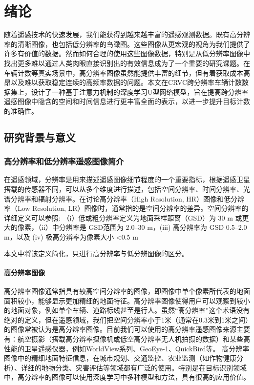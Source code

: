
\chapter{绪论}
随着遥感技术的快速发展，我们能获得到越来越丰富的遥感观测数据。既有高分辨率的清晰图像，也包括低分辨率的鸟瞰图。这些图像从更宏观的视角为我们提供了许多有价值的数据。然而如何合理的使用这些图像数据，特别是从低分辨率图像中找出更多难以通过人类肉眼直接识别出的有效信息成为了一个重要的研究课题。在车辆计数等真实场景中，高分辨率图像虽然能提供丰富的细节，但有着获取成本高昂以及难以获取稳定连续的高频率数据的问题。本文在CRVC跨分辨率车辆计数数据集上，设计了一种基于注意力机制的深度学习U型网络模型，旨在提高跨分辨率遥感图像中隐含的空间和时间信息进行更丰富全面的表示，以进一步提升目标计数的准确性。
\section{研究背景与意义}
\subsection{高分辨率和低分辨率遥感图像简介}
在遥感领域，分辨率是用来描述遥感图像细节程度的一个重要指标，根据遥感卫星搭载的传感器不同，可以从多个维度进行描述，包括空间分辨率、时间分辨率、光谱分辨率和辐射分辨率。在讨论高分辨率（High Resolution, HR）图像和低分辨率（Low Resolution, LR）图像时，通常指的是空间分辨率的差异。空间分辨率的详细定义可以参照\cite{MultispectralImageAnalysisUsingObjectOrientedParadigm}:
（i）低或粗分辨率定义为地面采样距离（GSD）为 30 m 或更大的像素，（ii）中分辨率是 GSD范围为 2.0–30 m，(iii) 高分辨率为 GSD 0.5–2.0 m，以及 (iv) 极高分辨率为像素大小 <0.5 m

本文中将该定义简化，只进行高分辨率与低分辨图像的区分。
\subsubsection{高分辨率图像}
高分辨率图像通常指具有较高空间分辨率的图像，即图像中单个像素所代表的地面面积较小，能够显示更加精细的地面特征。高分辨率图像使得用户可以观察到较小的地面对象，例如单个车辆、道路标线甚至是行人。虽然“高分辨率”这个术语没有绝对的定义，但在遥感领域，我们把空间分辨率小于1米（通常在0.3米到1米之间）的图像常被认为是高分辨率图像。目前我们可以使用的高分辨率遥感图像来源主要有：航空摄影（搭载高分辨率摄像机或低空高分辨率无人机拍摄的数据）和某些高性能的卫星遥感仪器，例如WorldView系列、GeoEye-1、QuickBird等。
高分辨率图像中的精细地面特征信息，在城市规划、交通监控、农业监测（如作物健康分析）、详细的地物分类、灾害评估等领域都有广泛的使用。特别是在目标识别领域中，高分辨率的图像可以使用深度学习中多种模型和方法，具有很高的应用价值。



